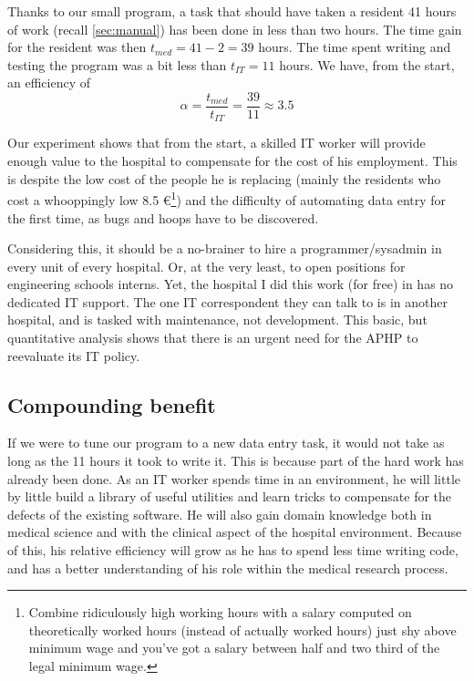 \documentclass[nobib]{tufte-handout}
\begin{document}
Thanks to our small program, a task that should have taken a resident 41 hours of work (recall \autoref{sec:manual}) has been done in less than two hours. The time gain for the resident was then $t_{med} = 41-2 = 39$ hours. The time spent writing and testing the program was a bit less than $t_{IT} = 11$ hours. We have, from the start, an efficiency of 
\begin{equation}
\alpha = \frac{t_{med}}{t_{IT}} = \frac{39}{11} \approx 3.5
\label{eq:alpha_true}
\end{equation}

Our experiment shows that from the start, a skilled IT worker will provide enough value to the hospital to compensate for the cost of his employment. This is despite the low cost of the people he is replacing (mainly the residents who cost a whooppingly low 8.5 €\footnote{Combine ridiculously high working hours with a salary computed on theoretically worked hours (instead of actually worked hours) just shy above minimum wage and you've got a salary between half and two third of the legal minimum wage.}) and the difficulty of automating data entry for the first time, as bugs and hoops have to be discovered.




Considering this, it should be a no-brainer to hire a programmer/sysadmin in every unit of every hospital. Or, at the very least, to open positions for engineering schools interns. Yet, the hospital I did this work (for free) in has no dedicated IT support. The one IT correspondent they can talk to is in another hospital, and is tasked with maintenance, not development. This basic, but quantitative analysis shows that there is an urgent need for the APHP to reevaluate its IT policy.

\subsection{Compounding benefit}
\label{sec:compounding}

If we were to tune our program to a new data entry task, it would not take as long as the 11 hours it took to write it. This is because part of the hard work has already been done. As an IT worker spends time in an environment, he will little by little build a library of useful utilities and learn tricks to compensate for the defects of the existing software. He will also gain domain knowledge both in medical science and with the clinical aspect of the hospital environment. Because of this, his relative efficiency will grow as he has to spend less time writing code, and has a better understanding of his role within the medical research process.
\end{document}
